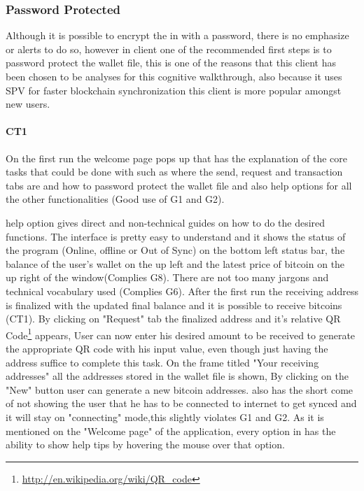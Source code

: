 \subsubsection{Password Protected}
Although it is possible to encrypt the \walletfile in \bitcoinclient with a password, there is no emphasize or alerts to do so, however in \multibit client one of the recommended first steps is to password protect the wallet file, this is one of the reasons that this client has been chosen to be analyses for this cognitive walkthrough, also because it uses SPV for faster blockchain synchronization this client is more popular amongst new users.

\paragraph{CT1}On the first run the welcome page pops up that has the explanation of the core tasks that could be done with \multibit such as where the send, request and transaction tabs are and how to password protect the wallet file and also help options for all the other functionalities (Good use of G1 and G2). 

\multibit help option gives direct and non-technical guides on how to do the desired functions. The interface is pretty easy to understand and it shows the status of the program (Online, offline or Out of Sync) on the bottom left  status bar, the balance of the user's wallet on the up left and the latest price of bitcoin on the up right of the window(Complies G8). There are not too many jargons and technical vocabulary used (Complies G6). After the first run the receiving address is finalized with the updated final balance and it is possible to receive bitcoins (CT1). By clicking on "Request" tab the finalized address and it's relative QR Code\footnote{\url{http://en.wikipedia.org/wiki/QR_code}} appears, User can now enter his desired amount to be received to generate the appropriate QR code with his input value, even though just having the address suffice to complete this task. On the frame titled "Your receiving addresses" all the addresses stored in the wallet file is shown, By clicking on the "New" button user can generate a new bitcoin addresses. \multibit also has the short come of not showing the user that he has to be connected to internet to get synced and it will stay on "connecting" mode,this slightly violates G1 and G2.
As it is mentioned on the "Welcome page" of the application, every option in \multibit has the ability to show help tips by hovering the mouse over that option.


